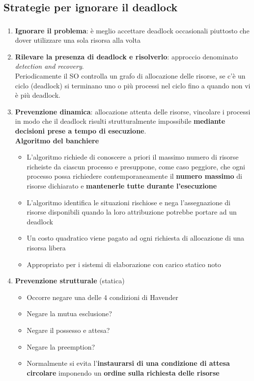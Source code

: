 \documentclass{beamer}
\newenvironment{mainframe}{
	\begin{frame}
		\frametitle{\insertsubsection}
		\framesubtitle{\insertsection}
	}{
	\end{frame}
}
\begin{document}
\subsection{Strategie per ignorare il deadlock}
\begin{mainframe}
	{\tiny
	\begin{enumerate}
		\item \textbf{Ignorare il problema}: è meglio accettare deadlock occasionali piuttosto che dover utilizzare una sola risorsa alla volta
		\item \textbf{Rilevare la presenza di deadlock e risolverlo}: approccio denominato \textit{detection and recovery}.\\
		Periodicamente il SO controlla un grafo di allocazione delle risorse, se c'è un ciclo (deadlock) si terminano uno o più processi nel ciclo fino a quando non vi è più deadlock.
		\item \textbf{Prevenzione dinamica}: allocazione attenta delle risorse, vincolare i processi in modo che il deadlock risulti strutturalmente impossibile \textbf{mediante decisioni prese a tempo di esecuzione}.\\
		\textbf{Algoritmo del banchiere}
		\begin{itemize}
			\item L'algoritmo richiede di conoscere a priori il massimo numero di risorse richeiste da ciascun processo e presuppone, come caso peggiore, che ogni processo possa richiedere contemporaneamente il \textbf{numero massimo} di risorse dichiarato e \textbf{mantenerle tutte durante l'esecuzione}
			\item L'algoritmo identifica le situazioni rischiose e nega l'assegnazione di risorse disponibili quando la loro attribuzione potrebbe portare ad un deadlock
			\item Un costo quadratico viene pagato ad ogni richiesta di allocazione di una risorsa libera
			\item Appropriato per i sistemi di elaborazione con carico statico noto
		\end{itemize}
		\item \textbf{Prevenzione strutturale} (statica)
		\begin{itemize}
			\item Occorre negare una delle 4 condizioni di Havender
			\item Negare la mutua esclusione?
			\item Negare il possesso e attesa?
			\item Negare la preemption?
			\item Normalmente si evita l'\textbf{instaurarsi di una condizione di attesa circolare} imponendo un \textbf{ordine sulla richiesta delle risorse}
		\end{itemize}
	\end{enumerate}
}
\end{mainframe}
\end{document}
